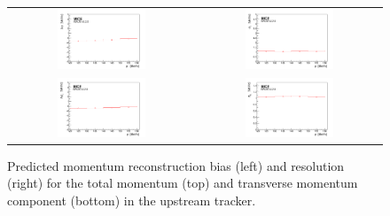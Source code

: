 \begin{figure}[ht]
	\centering
    \begin{tabular}{cc}
	    \includegraphics[width=0.5\textwidth]{upstream_p_bias_p_logo.pdf} &	
        \includegraphics[width=0.5\textwidth]{upstream_p_resolution_p_logo.pdf} \\
        \includegraphics[width=0.5\textwidth]{upstream_pt_bias_p_logo.pdf} &
        \includegraphics[width=0.5\textwidth]{upstream_pt_resolution_p_logo.pdf}
    \end{tabular}
	\caption{\label{trackers:performance:resolutions:up} Predicted momentum reconstruction bias (left) and resolution (right) for the total momentum (top) and transverse momentum component (bottom) in the upstream tracker.}
\end{figure}

